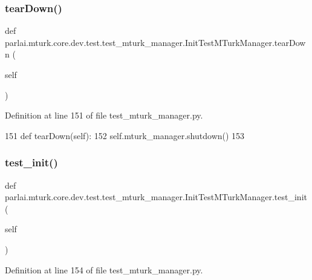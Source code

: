\subsubsection{\texorpdfstring{tear\+Down()}{tearDown()}}
{\footnotesize\ttfamily def parlai.\+mturk.\+core.\+dev.\+test.\+test\+\_\+mturk\+\_\+manager.\+Init\+Test\+M\+Turk\+Manager.\+tear\+Down (\begin{DoxyParamCaption}\item[{}]{self }\end{DoxyParamCaption})}



Definition at line 151 of file test\+\_\+mturk\+\_\+manager.\+py.


\begin{DoxyCode}
151     \textcolor{keyword}{def }tearDown(self):
152         self.mturk\_manager.shutdown()
153 
\end{DoxyCode}
\mbox{\label{classparlai_1_1mturk_1_1core_1_1dev_1_1test_1_1test__mturk__manager_1_1InitTestMTurkManager_ad53fc9a36b018265a16e328dab5ef715}} 
\subsubsection{\texorpdfstring{test\+\_\+init()}{test\_init()}}
{\footnotesize\ttfamily def parlai.\+mturk.\+core.\+dev.\+test.\+test\+\_\+mturk\+\_\+manager.\+Init\+Test\+M\+Turk\+Manager.\+test\+\_\+init (\begin{DoxyParamCaption}\item[{}]{self }\end{DoxyParamCaption})}



Definition at line 154 of file test\+\_\+mturk\+\_\+manager.\+py.


